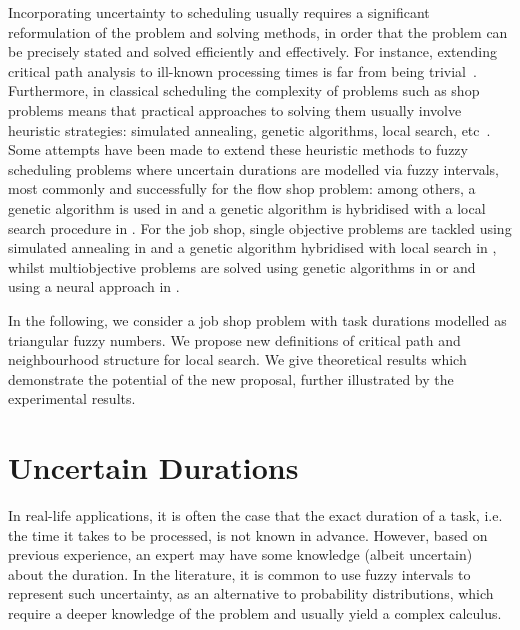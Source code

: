 \documentclass[letterpaper]{article}
\begin{document}
Incorporating uncertainty to scheduling usually requires a significant reformulation of the problem and solving methods, in order that the problem can be precisely stated and solved efficiently and effectively. For instance, extending critical path analysis to ill-known processing times is far from being trivial~\cite{Dubois2003}. Furthermore, in classical scheduling the complexity of problems such as shop problems means that practical approaches to solving them usually involve heuristic strategies: simulated annealing, genetic algorithms, local search, etc~\cite{Brucker2006}. Some attempts have been made to extend these heuristic methods to fuzzy scheduling problems where uncertain durations are modelled via fuzzy intervals, most commonly and successfully for the flow shop problem: among others, a genetic algorithm is used in \cite{Celano2003} and a genetic algorithm is hybridised with a local search procedure in \cite{Ishibuchi1998}. For the job shop, single objective problems are tackled using simulated annealing in \cite{Fortemps1997} and a genetic algorithm hybridised with local search in \cite{GonzalezRodriguez2007b}, whilst multiobjective problems are solved using genetic algorithms in \cite{Sakawa2000} or \cite{GonzalezRodriguez2008} and using a neural approach in \cite{Tavakkoli-Moghaddam2008}.

In the following, we consider a job shop problem with task durations modelled as triangular fuzzy numbers. We propose new definitions of critical path and neighbourhood structure for local search. We give theoretical results which demonstrate the potential of the new proposal, further illustrated by the experimental results.

%
\section{Uncertain Durations}\label{secUncertainTimes}
In real-life applications, it is often the case that the exact duration of a task, i.e. the time it takes to be processed, is not known in advance. However, based on previous experience, an expert may have some knowledge (albeit uncertain) about the duration. In the literature, it is common to use fuzzy intervals to represent such uncertainty, as an alternative to probability distributions, which require a deeper knowledge of the problem and usually yield a complex calculus.
\end{document}
